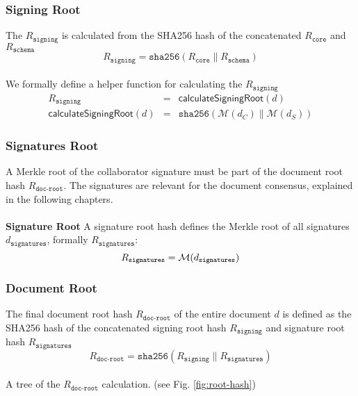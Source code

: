  \subsubsection{Signing Root}
The $R_{\texttt{signing}}$ is calculated from the SHA256 hash of the concatenated $R_\texttt{core}$ and $R_{\texttt{schema}}$
\newline
\begin{equation}
R_{\texttt{signing}} = \texttt{sha256}(R_\texttt{core}\| R_{\texttt{schema}})
\end{equation}\\
We formally define a helper function for calculating the $R_{\texttt{signing}}$ 
\begin{eqnarray}
R_{\texttt{signing}}& =&\mathsf{calculateSigningRoot}(d) \\
\mathsf{calculateSigningRoot}(d)& =& \texttt{sha256}(\mathcal{M}(d_C)\| \mathcal{M}(d_S))
\end{eqnarray}
 \subsubsection{Signatures Root}
 A Merkle root of the collaborator signature must be part of the document root hash $R_{\texttt{doc-root}}$. The signatures are relevant for the document consensus, explained in the following chapters. \\\\
\textbf{Signature Root} A signature root hash defines the Merkle root of all signatures $d_{\texttt{signatures}}$, formally $R_{\texttt{signatures}}$:
\newline
\begin{equation}
R_{\texttt{signatures}} = \mathcal{M}(d_{\texttt{signatures}})\\
\end{equation}
 \subsubsection{Document Root}
The final  document root hash $R_{\texttt{doc-root}}$ of the entire document $d$ is defined as the SHA256 hash of the concatenated signing root hash $R_{\texttt{signing}}$ and signature root hash $R_{\texttt{signatures}}$ 
\newline
 \begin{equation}
R_{\texttt{doc-root}} =  \texttt{sha256}(R_{\texttt{signing}}\|R_{\texttt{signatures}})
\end{equation}\\
A tree of the  $R_{\texttt{doc-root}}$ calculation. (see Fig. \ref{fig:root-hash})

